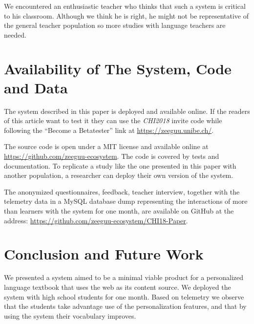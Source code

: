 We encountered an enthusiastic teacher who thinks that such a system is critical to his classroom. Although we think he is right, he might not be representative of the general teacher population so more studies with language teachers are needed.


\section{Availability of The System, Code and Data}

The system described in this paper is deployed and available online. If the readers of this article want to test it they can use the {\em CHI2018} invite code while following the  ``Become a Betatester'' link at \url{https://zeeguu.unibe.ch/}.

The source code is open under a MIT license and available online at \url{https://github.com/zeeguu-ecosystem}. The code is covered by tests and documentation. To replicate a study like the one presented in this paper with another population, a researcher can deploy their own version of the system. 

The anonymized questionnaires, feedback, teacher interview, 
together with the telemetry data in a MySQL database dump representing the interactions of more than \students learners with the system for one month, are available on GitHub at the address: \url{https://github.com/zeeguu-ecosystem/CHI18-Paper}. 





\section{Conclusion and Future Work}
We presented a system aimed to be a minimal viable product for a personalized language textbook that uses the web as its content source. We deployed the system with \studs high school students for one month. Based on telemetry we observe that the students take advantage use of the personalization features, and that by using the system their vocabulary improves. 

